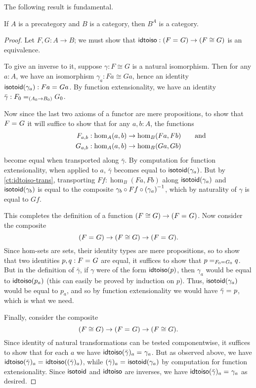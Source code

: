 The following result is fundamental.

\begin{thm}\label{ct:functor-cat}
  If $A$ is a precategory and $B$ is a category, then $B^A$ is a category.
\end{thm}
\begin{proof}
  Let $F,G:A\to B$; we must show that $\idtoiso:(\id{F}{G}) \to (F\cong G)$ is an equivalence.

  To give an inverse to it, suppose $\gamma:F\cong G$ is a natural isomorphism.
  Then for any $a:A$, we have an isomorphism $\gamma_a:Fa \cong Ga$, hence an identity $\isotoid(\gamma_a):\id{Fa}{Ga}$.
  By function extensionality, we have an identity $\bar{\gamma}:\id[(A_0\to B_0)]{F_0}{G_0}$.

  Now since the last two axioms of a functor are mere propositions, to show that $\id{F}{G}$ it will suffice to show that for any $a,b:A$, the functions
  \begin{align*}
    F_{a,b}&:\hom_A(a,b) \to \hom_B(Fa,Fb)\mathrlap{\qquad\text{and}}\\
    G_{a,b}&:\hom_A(a,b) \to \hom_B(Ga,Gb)
  \end{align*}
  become equal when transported along $\bar\gamma$.
  By computation for function extensionality, when applied to $a$, $\bar\gamma$ becomes equal to $\isotoid(\gamma_a)$.
  But by \autoref{ct:idtoiso-trans}, transporting $Ff:\hom_B(Fa,Fb)$ along $\isotoid(\gamma_a)$ and $\isotoid(\gamma_b)$ is equal to the composite $\gamma_b\circ Ff\circ \inv{(\gamma_a)}$, which by naturality of $\gamma$ is equal to $Gf$.

  This completes the definition of a function $(F\cong G) \to (\id F G)$.
  Now consider the composite
  \[ (\id F G) \to (F\cong G) \to (\id F G). \]
  Since hom-sets are sets, their identity types are mere propositions, so to show that two identities $p,q:\id F G$ are equal, it suffices to show that $\id[\id{F_0}{G_0}]{p}{q}$.
  But in the definition of $\bar\gamma$, if $\gamma$ were of the form $\idtoiso(p)$, then $\gamma_a$ would be equal to $\idtoiso(p_a)$ (this can easily be proved by induction on $p$).
  Thus, $\isotoid(\gamma_a)$ would be equal to $p_a$, and so by function extensionality we would have $\id{\bar\gamma}{p}$, which is what we need.

  Finally, consider the composite
  \[(F\cong G)\to  (\id F G) \to (F\cong G). \]
  Since identity of natural transformations can be tested componentwise, it suffices to show that for each $a$ we have $\id{\idtoiso(\bar\gamma)_a}{\gamma_a}$.
  But as observed above, we have $\id{\idtoiso(\bar\gamma)_a}{\idtoiso((\bar\gamma)_a)}$, while $\id{(\bar\gamma)_a}{\isotoid(\gamma_a)}$ by computation for function extensionality.
  Since $\isotoid$ and $\idtoiso$ are inverses, we have $\id{\idtoiso(\bar\gamma)_a}{\gamma_a}$ as desired.
\end{proof}

